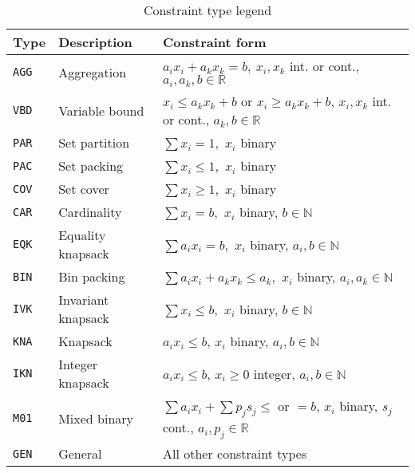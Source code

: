 

\begin{table}[h]
	\centering
	\caption{Constraint type legend \cite{MIPLIB}}
	\label{table:constraint_type}
	\begin{tabular}{@{}lll@{}}
		\toprule
		Type           & Description        & Constraint form                                                                                           \\ \midrule
		\texttt{AGG} & Aggregation        & $a_i x_i+a_k x_k=b,\ x_i , x_k$ int. or cont., $a_i , a_k , b \in \mathbb{R}$                  \\
		\texttt{VBD} & Variable bound     & $x_i \le a_k x_k + b$ or $x_i\ge a_k x_k + b$, $x_i, x_k$ int. or cont., $a_k, b\in\mathbb{R}$ \\
		\texttt{PAR} & Set partition      & $\sum x_i = 1,$ $x_i$ binary                                                                   \\
		\texttt{PAC} & Set packing        & $\sum x_i \le 1,$ $x_i$ binary                                                                 \\
		\texttt{COV} & Set cover          & $\sum x_i \ge 1,$ $x_i$ binary                                                                 \\
		\texttt{CAR} & Cardinality        & $\sum x_i = b,$ $x_i$ binary, $b\in\mathbb{N}$                                                 \\
		\texttt{EQK} & Equality knapsack  & $\sum a_i x_i = b,$ $x_i$ binary, $a_i , b\in\mathbb{N}$                                       \\
		\texttt{BIN} & Bin packing        & $\sum a_i x_i  + a_k x_k \le a_k,$ $x_i$ binary, $a_i , a_k\in\mathbb{N}$                      \\
		\texttt{IVK} & Invariant knapsack & $\sum x_i \le b,$ $x_i$ binary, $b\in\mathbb{N}$                                               \\
		\texttt{KNA} & Knapsack           & $a_i x_i \le b$, $x_i$ binary, $a_i,b\in\mathbb{N}$                                            \\
		\texttt{IKN} & Integer knapsack   & $a_i x_i \le b$, $x_i\ge 0$ integer, $a_i,b\in\mathbb{N}$                                      \\
		\texttt{M01} & Mixed binary       & $\sum a_i x_i + \sum p_j s_j \le$ or $=b$, $x_i$ binary, $s_j$ cont., $a_i, p_j\in\mathbb{R}$  \\
		\texttt{GEN} & General            & All other constraint types                                                                     \\ \bottomrule
	\end{tabular}
\end{table}